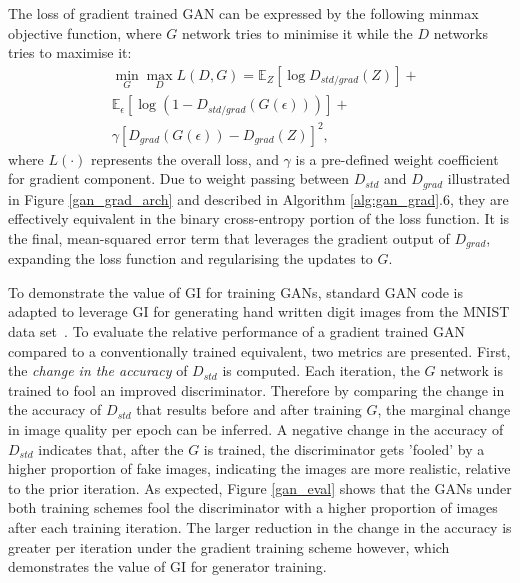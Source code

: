 \documentclass{article}
\begin{document}

The loss of gradient trained GAN can be expressed by the following minmax objective function, where $G$ network tries to minimise it while the $D$ networks tries to maximise it:
\begin{align}
    &\underset{G}{\min} \underset{D}{\max} L(D, G) = \mathbb{E}_{Z}[\log D_{std/grad}(Z)] + \\ \nonumber
    &\mathbb{E}_{\epsilon}[\log (1 - D_{std/grad}(G(\epsilon)))] + \\ \nonumber
    &\gamma [D_{grad}(G(\epsilon)) - D_{grad}(Z)]^2, 
\end{align}
where $L(\cdot)$ represents the overall loss, and $\gamma$ is a pre-defined weight coefficient for gradient component. Due to weight passing between $D_{std}$ and $D_{grad}$ illustrated in Figure \ref{gan_grad_arch} and described in Algorithm \ref{alg:gan_grad}.6, they are effectively equivalent in the binary cross-entropy portion of the loss function. It is the final, mean-squared error term that leverages the gradient output of $D_{grad}$, expanding the loss function and regularising the updates to $G$.

To demonstrate the value of GI for training GANs, standard GAN code is adapted to leverage GI for generating hand written digit images from the MNIST data set~\cite{deng2012mnist}. To evaluate the relative performance of a gradient trained GAN compared to a conventionally trained equivalent, two metrics are presented. First, the \textit{change in the accuracy} of $D_{std}$ is computed. Each iteration, the $G$ network is trained to fool an improved discriminator. Therefore by comparing the change in the accuracy of $D_{std}$ that results before and after training $G$, the marginal change in image quality per epoch can be inferred. A negative change in the accuracy of $D_{std}$ indicates that, after the $G$ is trained, the discriminator gets 'fooled' by a higher proportion of fake images, indicating the images are more realistic, relative to the prior iteration. As expected, Figure \ref{gan_eval} shows that the GANs under both training schemes fool the discriminator with a higher proportion of images after each training iteration. The larger reduction in the change in the accuracy is greater per iteration under the gradient training scheme however, which demonstrates the value of GI for generator training.
\end{document}
